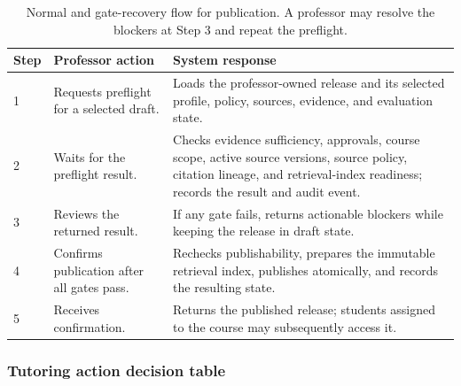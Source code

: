 \begin{table}[htbp]
  \centering
  \small
  \begin{tabularx}{\textwidth}{p{}X X}
    \toprule
    Step & Professor action & System response \\
    \midrule
    1 & Requests preflight for a selected draft. & Loads the professor-owned release and its selected profile, policy, sources, evidence, and evaluation state. \\
    2 & Waits for the preflight result. & Checks evidence sufficiency, approvals, course scope, active source versions, source policy, citation lineage, and retrieval-index readiness; records the result and audit event. \\
    3 & Reviews the returned result. & If any gate fails, returns actionable blockers while keeping the release in draft state. \\
    4 & Confirms publication after all gates pass. & Rechecks publishability, prepares the immutable retrieval index, publishes atomically, and records the resulting state. \\
    5 & Receives confirmation. & Returns the published release; students assigned to the course may subsequently access it. \\
    \bottomrule
  \end{tabularx}
  \caption{Normal and gate-recovery flow for publication. A professor may resolve the blockers at Step 3 and repeat the preflight.}
  \label{tab:publication-use-case-flow}
\end{table}

\subsubsection{Tutoring action decision table}
\label{sec:tutoring-decision-table}

